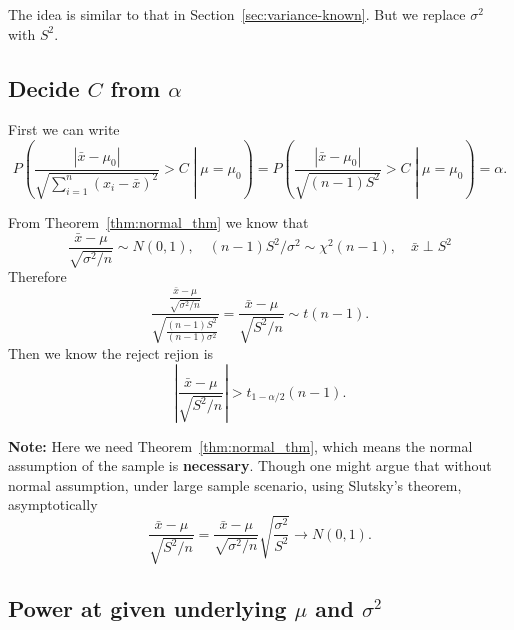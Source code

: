 \documentclass[a4paper,12pt]{article}
\begin{document}
The idea is similar to that in Section~\ref{sec:variance-known}. But we replace $\sigma^2$ with $S^2$.

\subsection{Decide $C$ from $\alpha$}
\label{sec:decide-c-from-1}

First we can write
\[
  P\left(
    \frac{\left|\bar{x}-\mu_0\right|}{\sqrt{\sum\limits_{i = 1}^n\left(x_i - \bar{x}\right)^2}} > C
    \middle| \mu = \mu_0
  \right)
  = P\left(
    \frac{\left|\bar{x}-\mu_0\right|}{\sqrt{\left(n - 1\right)S^2}} > C
    \middle| \mu = \mu_0
  \right)
  = \alpha
  .  
\]

From Theorem~\ref{thm:normal_thm} we know that
\[
  \frac{\bar{x} - \mu}{\sqrt{\sigma^2 / n}} \sim N\left(0, 1\right)
  ,\quad
  \left(n - 1\right)S^2 / \sigma^2 \sim \chi^2\left(n - 1\right)
  ,\quad
  \bar{x} \perp S^2
\]
Therefore
\[
  \frac{
    \frac{\bar{x} - \mu}{\sqrt{\sigma^2 / n}}
  }{
    \sqrt{
      \frac{\left(n - 1\right)S^2}{\left(n - 1\right)\sigma^2}
    }
  }
  = \frac{\bar{x} - \mu}{\sqrt{S^2 / n}}
  \sim t(n - 1)
  .
\]
Then we know the reject rejion is
\[
  \left|
    \frac{\bar{x} - \mu}{\sqrt{S^2 / n}}
  \right|
  > t_{1 - \alpha / 2}\left(n - 1\right)
  .
\]

\textbf{Note: } Here we need Theorem~\ref{thm:normal_thm}, which means the normal assumption of the sample is \textbf{necessary}. Though one might argue that without normal assumption, under large sample scenario, using Slutsky's theorem, asymptotically
\[
  \frac{\bar{x} - \mu}{\sqrt{S^2 / n}}
  = \frac{\bar{x} - \mu}{\sqrt{\sigma^2 / n}}
  \sqrt{\frac{\sigma^2}{S^2}}
  \rightarrow N\left(0, 1\right)
  .
\]

\subsection{Power at given underlying $\mu$ and $\sigma^2$}
\label{sec:power-at-given-1}
\end{document}
